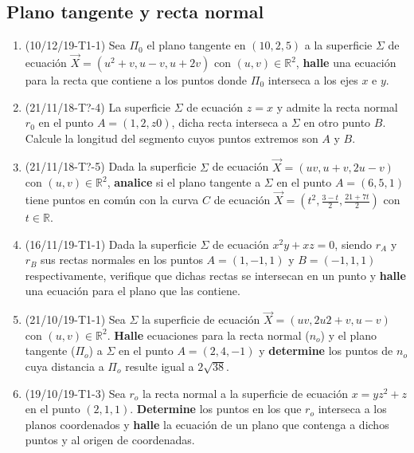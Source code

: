 \documentclass[12pt,a4paper]{article}
\renewcommand{\b}[1]{\textbf{#1}}
\newcommand{\R}{\mathbb{R}}
\begin{document}
\subsection{Plano tangente y recta normal}
\begin{enumerate}
	\item (10/12/19-T1-1) Sea $\Pi_0$ el plano tangente en $( 10, 2, 5 )$ a la superficie $\Sigma$ de ecuación $\vec{X}= ( u^2 + v, u - v, u + 2 v )$ con $( u, v ) \in \R^2$, \b{halle} una ecuación para la recta que contiene a los puntos donde $\Pi_0$ interseca a los ejes $x$ e $y$.
	
	\item (21/11/18-T?-4) La superficie $ \Sigma $ de ecuación $  z = x  $ y admite la recta normal $ r_0  $ en el punto $ A = ( 1, 2, z 0 ) $, dicha recta interseca a $ \Sigma $ en otro punto $ B $. Calcule la longitud del segmento cuyos puntos extremos son $ A $ y $ B $.
	
	\item (21/11/18-T?-5) Dada la superficie $ \Sigma $ de ecuación $ \vec{X} = ( u v, u + v, 2 u - v ) $ con $ ( u, v )\in\R^2$, \b{analice} si el plano tangente a $ \Sigma $ en el punto $ A = ( 6, 5, 1 ) $ tiene puntos en común con la curva $ C $ de ecuación $\vec{X}=\left(t^2, \frac{3 - t}{2}, \frac{21 + 7 t}{2} \right)$ con $ t \in\R $.
	
	\item (16/11/19-T1-1) Dada la superficie $ \Sigma $ de ecuación $ x^2 y + x z = 0 $, siendo $ r_A $ y $ r_B $ sus rectas normales en los puntos $ A = ( 1, - 1, 1 ) $ y $ B = (- 1, 1, 1 ) $ respectivamente, verifique que dichas rectas se intersecan en un punto y \b{halle} una ecuación para el plano que las contiene.
	
	\item (21/10/19-T1-1) Sea $ \Sigma $ la superficie de ecuación $ \vec{X} = ( u v, 2 u 2 + v, u - v ) $ con $( u, v )\in\R^2 $. \b{Halle} ecuaciones para la recta normal ($n_o$) y el plano tangente ($\Pi_o$) a $ \Sigma $ en el punto $ A = ( 2, 4, - 1 ) $ y \b{determine} los puntos de	$ n_o $ cuya distancia a $ \Pi_o $ resulte igual a $ 2 \sqrt{38}  $.
	
	\item (19/10/19-T1-3) Sea $ r_o $ la recta normal a la superficie de ecuación $ x = y z^2 + z $ en el punto $ ( 2, 1, 1 )  $. \b{Determine} los puntos en los que $ r_o $ interseca a los planos coordenados y \b{halle} la ecuación de un plano que contenga a dichos puntos y al origen de coordenadas.
	

\end{enumerate}
\end{document}
